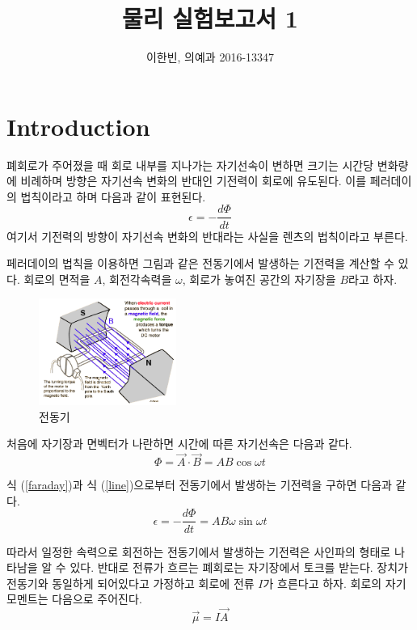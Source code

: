 \documentclass[a4paper]{article}
\title{물리 실험보고서 1}
\author{이한빈, 의예과 2016-13347}
\begin{document}
\maketitle

\section{Introduction}
	폐회로가 주어졌을 때 회로 내부를 지나가는 자기선속이 변하면 크기는 시간당 변화량에 비례하며 방향은 자기선속 변화의 반대인 기전력이 회로에 유도된다.
	이를 페러데이의 법칙이라고 하며 다음과 같이 표현된다.
	\begin{equation} \label{faraday}
		\epsilon = -\frac{d\Phi}{dt} 
	\end{equation}
	여기서 기전력의 방향이 자기선속 변화의 반대라는 사실을 렌츠의 법칙이라고 부른다.

	페러데이의 법칙을 이용하면 그림과 같은 전동기에서 발생하는 기전력을 계산할 수 있다.
	회로의 면적을 $A$, 회전각속력을 $\omega$, 회로가 놓여진 공간의 자기장을 $B$라고 하자.
	\begin{figure}[h] 
		\centering 
		\includegraphics[width=0.4\textwidth]{img/motor.png}
		\caption{전동기}
		\label{fig:motor}
	\end{figure}
	처음에 자기장과 면벡터가 나란하면 시간에 따른 자기선속은 다음과 같다.
	\begin{equation} \label{line}
		\Phi = \vec{A} \cdot \vec{B} = AB\cos{}\omega{}t
	\end{equation} 

	식 (\ref{faraday})과 식 (\ref{line})으로부터 전동기에서 발생하는 기전력을 구하면 다음과 같다.
	\begin{equation}
		\epsilon = -\frac{d\Phi}{dt} = AB\omega{}\sin{}\omega{}t
	\end{equation}

	따라서 일정한 속력으로 회전하는 전동기에서 발생하는 기전력은 사인파의 형태로 나타남을 알 수 있다.
	반대로 전류가 흐르는 폐회로는 자기장에서 토크를 받는다.
	장치가 전동기와 동일하게 되어있다고 가정하고 회로에 전류 $I$가 흐른다고 하자.
	회로의 자기모멘트는 다음으로 주어진다.
	\begin{equation}
		\vec{\mu} = I\vec{A}
	\end{equation}
\end{document}
